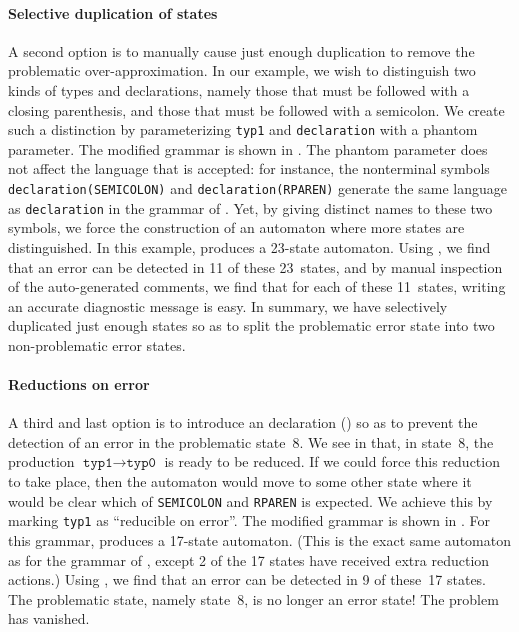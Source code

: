 \documentclass[onecolumn,11pt,nocopyrightspace,preprint]{sigplanconf}
\begin{document}
\paragraph{Selective duplication of states}

A second option is to manually cause just enough duplication to remove the
problematic over-approximation. In our example, we wish to distinguish two kinds
of types and declarations, namely those that must be followed with a closing
parenthesis, and those that must be followed with a semicolon. We create
such a distinction by parameterizing \verb+typ1+ and \verb+declaration+ with a
phantom parameter. The modified grammar is shown
in . The phantom parameter does not affect the
language that is accepted: for instance, the nonterminal
symbols \texttt{declaration(SEMICOLON)} and
\texttt{declaration(RPAREN)} generate the same language as \texttt{declaration}
in the grammar of . Yet, by giving
distinct names to these two symbols, we force the construction of an
automaton where more states are distinguished. In this example, \menhir produces
a 23-state automaton. Using \olisterrors, we find that an error can be
detected in 11 of these 23~states, and by manual inspection of the
auto-generated comments, we find that for each of these 11~states, writing an
accurate diagnostic message is easy. In summary, we have selectively duplicated
just enough states so as to split the problematic error state into two
non-problematic error states.


\paragraph{Reductions on error}

A third and last option is to introduce an \donerrorreduce declaration
() so as to prevent the detection of an error in the
problematic state~8. We see in  that, in
state~8, the production $\texttt{typ1} \rightarrow \texttt{typ0}$ is ready to
be reduced. If we could force this reduction to take place, then the automaton
would move to some other state where it would be clear which
of \verb+SEMICOLON+ and \verb+RPAREN+ is expected. We
achieve this by marking \verb+typ1+ as ``reducible on error''.
The modified grammar is shown
in .
For this grammar, \menhir produces a 17-state automaton.
(This is the exact same automaton as for the grammar of ,
except 2 of the 17 states have received extra reduction actions.)
Using \olisterrors, we find that an error can be detected in 9 of these~17 states.
The problematic state, namely state~8, is no longer an error state!
The problem has vanished.
\end{document}
